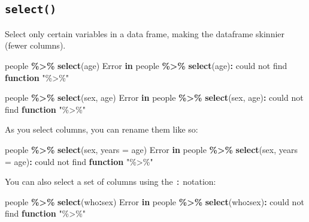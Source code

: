 \documentclass[
]{book}
\newenvironment{Shaded}{\begin{snugshade}}{\end{snugshade}}
\newcommand{\AttributeTok}[1]{\textcolor[rgb]{0.13,0.29,0.53}{#1}}
\newcommand{\ControlFlowTok}[1]{\textcolor[rgb]{0.13,0.29,0.53}{\textbf{#1}}}
\newcommand{\FunctionTok}[1]{\textcolor[rgb]{0.13,0.29,0.53}{\textbf{#1}}}
\newcommand{\NormalTok}[1]{#1}
\newcommand{\SpecialCharTok}[1]{\textcolor[rgb]{0.81,0.36,0.00}{\textbf{#1}}}
\newcommand{\StringTok}[1]{\textcolor[rgb]{0.31,0.60,0.02}{#1}}
\begin{document}
\subsection*{\texorpdfstring{\texttt{select()}}{select()}}\label{select}

Select only certain variables in a data frame, making the dataframe skinnier (fewer columns).

\begin{Shaded}
\begin{Highlighting}[]
\NormalTok{people }\SpecialCharTok{\%\textgreater{}\%} \FunctionTok{select}\NormalTok{(age)}
\NormalTok{Error }\ControlFlowTok{in}\NormalTok{ people }\SpecialCharTok{\%\textgreater{}\%} \FunctionTok{select}\NormalTok{(age)}\SpecialCharTok{:}\NormalTok{ could not find }\ControlFlowTok{function} \StringTok{"\%\textgreater{}\%"}
\end{Highlighting}
\end{Shaded}

\begin{Shaded}
\begin{Highlighting}[]
\NormalTok{people }\SpecialCharTok{\%\textgreater{}\%} \FunctionTok{select}\NormalTok{(sex, age)}
\NormalTok{Error }\ControlFlowTok{in}\NormalTok{ people }\SpecialCharTok{\%\textgreater{}\%} \FunctionTok{select}\NormalTok{(sex, age)}\SpecialCharTok{:}\NormalTok{ could not find }\ControlFlowTok{function} \StringTok{"\%\textgreater{}\%"}
\end{Highlighting}
\end{Shaded}

As you select columns, you can rename them like so:

\begin{Shaded}
\begin{Highlighting}[]
\NormalTok{people }\SpecialCharTok{\%\textgreater{}\%} \FunctionTok{select}\NormalTok{(sex, }\AttributeTok{years =}\NormalTok{ age)}
\NormalTok{Error }\ControlFlowTok{in}\NormalTok{ people }\SpecialCharTok{\%\textgreater{}\%} \FunctionTok{select}\NormalTok{(sex, }\AttributeTok{years =}\NormalTok{ age)}\SpecialCharTok{:}\NormalTok{ could not find }\ControlFlowTok{function} \StringTok{"\%\textgreater{}\%"}
\end{Highlighting}
\end{Shaded}

You can also select a set of columns using the \texttt{:} notation:

\begin{Shaded}
\begin{Highlighting}[]
\NormalTok{people }\SpecialCharTok{\%\textgreater{}\%} \FunctionTok{select}\NormalTok{(who}\SpecialCharTok{:}\NormalTok{sex)}
\NormalTok{Error }\ControlFlowTok{in}\NormalTok{ people }\SpecialCharTok{\%\textgreater{}\%} \FunctionTok{select}\NormalTok{(who}\SpecialCharTok{:}\NormalTok{sex)}\SpecialCharTok{:}\NormalTok{ could not find }\ControlFlowTok{function} \StringTok{"\%\textgreater{}\%"}
\end{Highlighting}
\end{Shaded}
\end{document}
